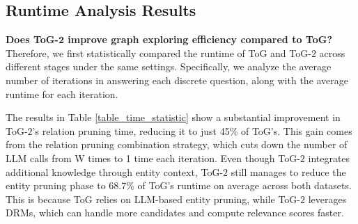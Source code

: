 \documentclass{article} %
\begin{document}
\subsection{Runtime Analysis Results}
\label{apd:efficiency}
\textbf{Does ToG-$\textbf{2}$ improve graph exploring efficiency compared to ToG?} Therefore, we first statistically compared the runtime of ToG and ToG-$2$ across different stages under the same settings. Specifically, we analyze the average number of iterations in answering each discrete question, along with the average runtime for each iteration. 

The results in Table \ref{table_time_statistic} show a substantial improvement in ToG-$2$’s relation pruning time, reducing it to just 45\% of ToG’s. This gain comes from the relation pruning combination strategy, which cuts down the number of LLM calls from W times to 1 time each iteration. Even though ToG-$2$ integrates additional knowledge through entity context, ToG-$2$ still manages to reduce the entity pruning phase to 68.7\% of ToG’s runtime on average across both datasets. This is because ToG relies on LLM-based entity pruning, while ToG-$2$ leverages DRMs, which can handle more candidates and compute relevance scores faster.
\begin{table}[ht]
    \centering
    \renewcommand{\arraystretch}{1.3}
    \caption{Running time comparison of ToG-2 and ToG on FEVER and AdvHotpotQA datasets.}
    \vspace{-0.3cm}
    \label{table_time_statistic}
\end{table}
\end{document}

